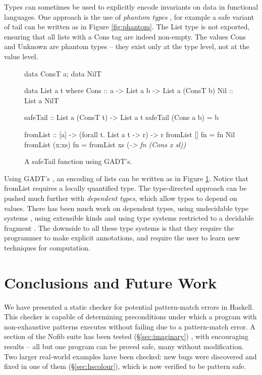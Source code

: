 \documentclass[preprint]{sigplanconf}
\newcommand{\C}[1]{\textsf{#1}}
\begin{document}
Types can sometimes be used to explicitly encode invariants on data in functional languages. One approach is the use of \textit{phantom types} \citep{fluet:phantom}, for example a safe variant of \C{tail} can be written as in Figure \ref{fig:phantom}. The \C{List} type is not exported, ensuring that all lists with a \C{Cons} tag are indeed non-empty. The values \C{Cons} and \C{Unknown} are phantom types -- they exist only at the type level, not at the value level.

\begin{figure}
\begin{code}
data ConsT a; data NilT

data List a t where
    Cons  :: a -> List a b -> List a (ConsT b)
    Nil   :: List a NilT

safeTail :: List a (ConsT t) -> List a t
safeTail (Cons a b) = b

fromList :: [a] -> (forall t. List a t -> r) -> r
fromList []      fn = fn Nil
fromList (x:xs)  fn = fromList xs (\sl -> fn (Cons x sl))
\end{code}
\caption{A \C{safeTail} function using GADT's.}
\label{fig:gadt}
\end{figure}

Using GADT's \citep{spj:gadt}, an encoding of lists can be written as in Figure \ref{fig:gadt}. Notice that \C{fromList} requires a locally quantified type. The type-directed approach can be pushed much further with \textit{dependent types}, which allow types to depend on values. There has been much work on dependent types, using undecidable type systems \citep{epigram}, using extensible kinds \citep{omega} and using type systems restricted to a decidable fragment \citep{xi:dependent_practical}. The downside to all these type systems is that they require the programmer to make explicit annotations, and require the user to learn new techniques for computation.


\section{Conclusions and Future Work}
\label{sec:conclusion}

We have presented a static checker for potential pattern-match errors in Haskell. This checker is capable of determining preconditions under which a program with non-exhaustive patterns executes without failing due to a pattern-match error. A section of the Nofib suite has been tested (\S\ref{sec:imaginary}) , with encouraging results -- all but one program can be proved safe, many without modification. Two larger real-world examples have been checked: new bugs were discovered and fixed in one of them (\S\ref{sec:hscolour}), which is now verified to be pattern safe.
\end{document}

